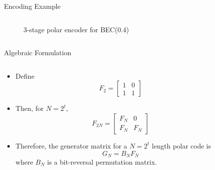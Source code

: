 \documentclass[8pt, compress]{beamer}
\begin{document}
\begin{frame}{Encoding Example}
\begin{columns}
\begin{column}{0.7\linewidth}
\begin{figure}
\begin{tikzpicture}[channel/.style={rectangle, draw=black!80, fill=white!5, very thick, minimum size=20}, scale=0.5, every node/.style={scale=0.8}]
        \end{tikzpicture}
        
        \caption{3-stage polar encoder for BEC(0.4)}
        
        \end{figure}
    \end{column}
\end{columns}    
\end{frame}

\begin{frame}{Algebraic Formulation}
    \begin{columns}
        \begin{column}{0.4\linewidth}
        \begin{itemize}
            \item<4-> Define
            $$
            F_2 = \begin{bmatrix} 1 & 0\\ 1 & 1 \end{bmatrix}
            $$
            \item<5-> Then, for $N = 2^t$,
            $$
            F_{2N} = \begin{bmatrix} F_N & 0\\ F_N & F_N \end{bmatrix}
            $$
            \item<6-> Therefore, the generator matrix for a $N = 2^t$ length polar code is
            $$
            G_N = B_N F_N
            $$
            where $B_N$ is a bit-reversal permutation matrix.
        \end{itemize}
        \end{column}
        \begin{column}{0.6\linewidth}
        \end{column}
    \end{columns}
\end{frame}
\end{document}
